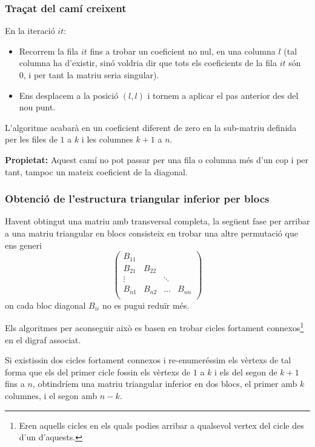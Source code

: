 \documentclass[8pt]{beamer}
\begin{document}
\begin{frame}
  \frametitle{Traçat del camí creixent}

En la iteració $it$:
\begin{itemize}
\item Recorrem la fila $it$ fins a trobar un coeficient no nul, en una columna $l$ (tal columna ha d'existir, sinó voldria dir que tots els coeficients de la fila $it$ són 0, i per tant la matriu seria singular).
\item Ens desplacem a la posició $(l,l)$ i tornem a aplicar el pas anterior des del nou punt.
\end{itemize}
 
L'algoritme acabarà en un coeficient diferent de zero en la sub-matriu definida per les files de $1$ a $k$ i les columnes $k+1$ a $n$.

\textbf{Propietat: }Aquest camí no pot passar per una fila o columna més d'un cop i per tant, tampoc un mateix coeficient de la diagonal.

\end{frame}

\begin{frame}
  \frametitle{Obtenció de l'estructura triangular inferior per blocs}

Havent obtingut una matriu amb transversal completa, la següent fase per arribar a una matriu triangular en blocs consisteix en trobar una altre permutació que ens generi
\[\begin{pmatrix}
B_{11}	\\
B_{21}	&	B_{22}	\\
\vdots		&	& \ddots	&	\\
B_{n1}	&	B_{n2}	&	\dots	&	B_{nn}	\\
\end{pmatrix}\]
on cada bloc diagonal $B_{ii}$ no es pugui reduïr més.

Els algoritmes per aconseguir això es basen en trobar cicles fortament connexos\footnote{Eren aquells cicles en els quals podies arribar a qualsevol vertex del cicle des d'un d'aquests.} en el digraf associat.

Si existissin dos cicles fortament connexos i re-enumeréssim els vèrtexs de tal forma que els del primer cicle fossin els vèrtexs de  $1$ a $k$ i els del segon de $k+1$ fins a $n$, obtindríem una matriu triangular inferior en dos blocs, el primer amb $k$ columnes, i el segon amb $n-k$. 

\end{frame}
\end{document}
